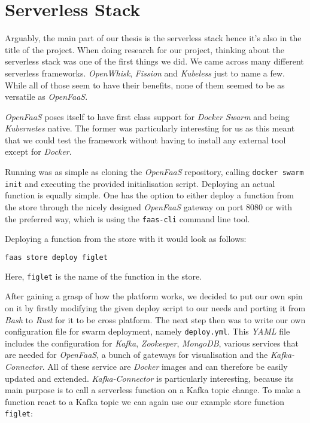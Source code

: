 \section{Serverless Stack}

Arguably, the main part of our thesis is the serverless stack hence it's also in the title of the
project. When doing research for our project, thinking about the serverless stack was one of the
first things we did. We came across many different serverless frameworks. \textit{OpenWhisk},
\textit{Fission} and \textit{Kubeless} just to name a few. While all of those seem to have their
benefits, none of them seemed to be as versatile as \textit{OpenFaaS}.

\textit{OpenFaaS} poses itself to have first class support for \textit{Docker Swarm} and being
\textit{Kubernetes} native. The former was particularly interesting for us as this meant that we
could test the framework without having to install any external tool except for  \textit{Docker}.

Running was as simple as cloning the \textit{OpenFaaS} repository, calling \texttt{docker swarm
init} and executing the provided initialisation script. Deploying an actual function is equally
simple. One has the option to either deploy a function from the store through the nicely designed
\textit{OpenFaaS} gateway on port 8080 or with the preferred way, which is using the
\texttt{faas-cli} command line tool.

Deploying a function from the store with it would look as follows:

\begin{lstlisting}[language=bash]
faas store deploy figlet
\end{lstlisting}

Here, \texttt{figlet} is the name of the function in the store.

After gaining a grasp of how the platform works, we decided to put our own spin on it by firstly
modifying the given deploy script to our needs and porting it from \textit{Bash} to \textit{Rust}
for it to be cross platform. The next step then was to write our own configuration file for swarm
deployment, namely \texttt{deploy.yml}. This \textit{YAML} file includes the configuration for
\textit{Kafka}, \textit{Zookeeper}, \textit{MongoDB}, various services that are needed for
\textit{OpenFaaS}, a bunch of gateways for visualisation and the \textit{Kafka-Connector}. All of
these service are \textit{Docker} images and can therefore be easily updated and extended.
\textit{Kafka-Connector} is particularly interesting, because its main purpose is to call a
serverless function on a Kafka topic change. To make a function react to a Kafka topic we can again
use our example store function \texttt{figlet}:

